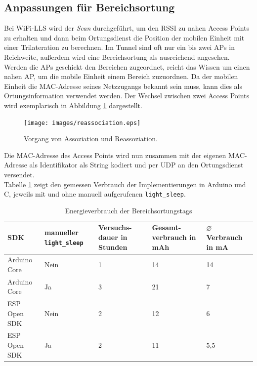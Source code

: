 \subsection{Anpassungen für Bereichsortung}
\label{ch:phase1:sec:anpassungbereich}
Bei WiFi-LLS wird der \emph{Scan} durchgeführt, um den RSSI zu nahen Access Points zu erhalten und dann beim Ortungsdienst die Position der mobilen Einheit mit einer Trilateration zu berechnen.
Im Tunnel sind oft nur ein bis zwei APs in Reichweite, außerdem wird eine Bereichsortung als ausreichend angesehen. \\
Werden die APs geschickt den Bereichen zugeordnet, reicht das Wissen um einen nahen AP, um die mobile Einheit einem Bereich zuzuordnen.
Da der mobilen Einheit die MAC-Adresse seines Netzzugangs bekannt sein muss, kann dies als Ortungsinformation verwendet werden.
Der Wechsel zwischen zwei Access Points wird exemplarisch in Abbildung \ref{fig:reassociation} dargestellt.

\begin{figure}[h!]
  \centering
	\texttt{[image: images/reassociation.eps]}
  \caption{Vorgang von Assoziation und Reassoziation.}
  \label{fig:reassociation}
\end{figure}

Die MAC-Adresse des Access Points wird nun zusammen mit der eigenen MAC-Adresse als Identifikator als String kodiert und per UDP an den Ortungsdienst versendet.\\
Tabelle \ref{table:naiveconsumption} zeigt den gemessen Verbrauch der Implementierungen in Arduino und C, jeweils mit und ohne manuell aufgerufenen \texttt{light\_sleep}.

\begin{table}[h]
	\centering
	\caption{Energieverbrauch der Bereichsortungstags}
	\label{table:naiveconsumption}
	\begin{tabular}{p{3cm}|p{2.2cm}|p{1.7cm}|p{2.5cm}|p{2.5cm}}
		SDK & manueller \texttt{light\_sleep} & Versuchs-dauer in Stunden & Gesamt-verbrauch in mAh & $\varnothing$ Verbrauch in mA \\
		\hline
		Arduino Core & Nein & 1 & 14 & 14 \\
		Arduino Core & Ja & 3 & 21 & 7 \\
		ESP Open SDK & Nein & 2 & 12 & 6 \\
		ESP Open SDK & Ja & 2 & 11 & 5,5 \\
	\end{tabular}
\end{table}

